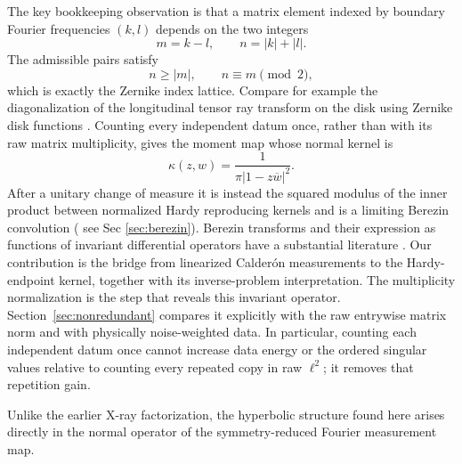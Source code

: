 \IfFileExists{iopjournal.cls}{\documentclass{iopjournal}}{\documentclass{iopjournal-draft}}
\theoremstyle{definition}
\theoremstyle{remark}
\numberwithin{equation}{section}
\begin{document}
The key bookkeeping observation is that a matrix element indexed by boundary Fourier frequencies $(k,l)$ depends on the two integers
\begin{equation}
 m=k-l,\qquad n=|k|+|l|.
 \label{eq:intro-invariants}
\end{equation}
The admissible pairs satisfy
\[
 n\geq |m|,\qquad n\equiv m\pmod 2,
\]
which is exactly the Zernike index lattice. Compare for example the diagonalization of the longitudinal tensor ray transform on the disk using Zernike disk functions \cite{KazantsevBukhgeim2004}.  Counting every independent datum once, rather than with its raw matrix multiplicity, gives the moment map whose normal kernel is
\begin{equation}
 \kappa(z,w)=\frac1{\pi|1-z\overline w|^2}.
 \label{eq:intro-kernel}
\end{equation}
After a unitary change of measure it is instead the squared modulus of the inner product between normalized Hardy reproducing kernels  and is a limiting Berezin convolution ( see Sec \ref{sec:berezin}).  Berezin transforms and their expression as functions of invariant differential operators have a substantial literature \cite{Berezin1975,UnterbergerUpmeier1994,Englis1995,Stroethoff1997}.  Our contribution is the bridge from linearized Calder\'on measurements to the Hardy-endpoint kernel, together with its inverse-problem interpretation.
The multiplicity normalization is the step that reveals this invariant operator.  
Section~\ref{sec:nonredundant} compares it explicitly with the raw entrywise matrix norm and with physically noise-weighted data.  In particular, counting each independent datum once cannot increase data energy or the ordered singular values relative to counting every repeated copy in raw $\ell^2$; it removes that repetition gain.

Unlike the earlier X-ray factorization, the hyperbolic structure found
here arises directly in the normal operator of the symmetry-reduced
Fourier measurement map.
\end{document}
